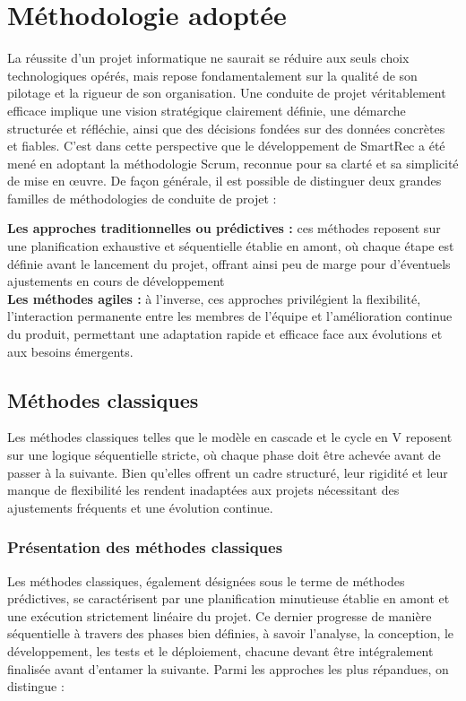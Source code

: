 \section{Méthodologie adoptée}
\par 
La réussite d'un projet informatique ne saurait se réduire aux seuls choix technologiques opérés, mais repose fondamentalement sur la qualité de son pilotage et la rigueur de son organisation. Une conduite de projet véritablement efficace implique une vision stratégique clairement définie, une démarche structurée et réfléchie, ainsi que des décisions fondées sur des données concrètes et fiables. C'est dans cette perspective que le développement de SmartRec a été mené en adoptant la méthodologie Scrum, reconnue pour sa clarté et sa simplicité de mise en œuvre. De façon générale, il est possible de distinguer deux grandes familles de méthodologies de conduite de projet :
	\begin{itemize}[label=\textbullet]
\textbullet \hspace{0.2cm} \textbf {Les approches traditionnelles ou prédictives : } ces méthodes reposent sur une planification exhaustive et séquentielle établie en amont, où chaque étape est définie avant le lancement du projet, offrant ainsi peu de marge pour d'éventuels ajustements en cours de développement\\
\textbullet \hspace{0.2cm} \textbf {Les méthodes agiles : } à l'inverse, ces approches privilégient la flexibilité, l'interaction permanente entre les membres de l'équipe et l'amélioration continue du produit, permettant une adaptation rapide et efficace face aux évolutions et aux besoins émergents.
    \end{itemize}



\subsection{Méthodes classiques}
Les méthodes classiques telles que le modèle en cascade et le cycle en V reposent sur une logique séquentielle stricte, où chaque phase doit être achevée avant de passer à la suivante. Bien qu'elles offrent un cadre structuré, leur rigidité et leur manque de flexibilité les rendent inadaptées aux projets nécessitant des ajustements fréquents et une évolution continue.
\subsubsection{Présentation des méthodes classiques }
Les méthodes classiques, également désignées sous le terme de méthodes prédictives, se caractérisent par une planification minutieuse établie en amont et une exécution strictement linéaire du projet. Ce dernier progresse de manière séquentielle à travers des phases bien définies, à savoir l'analyse, la conception, le développement, les tests et le déploiement, chacune devant être intégralement finalisée avant d'entamer la suivante. Parmi les approches les plus répandues, on distingue :


